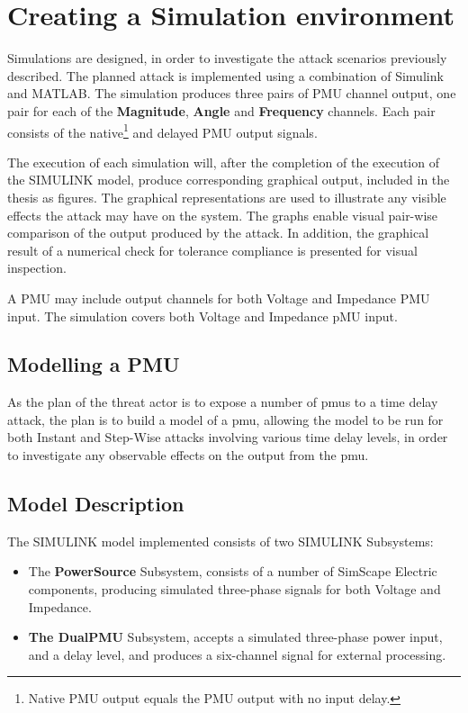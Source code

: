 \section{Creating a Simulation environment}

Simulations are designed, in order to investigate the attack scenarios previously described. The planned attack is implemented using a combination of Simulink and MATLAB. The simulation produces three pairs of PMU channel output, one pair for each of the \textbf{Magnitude}, \textbf{Angle} and \textbf{Frequency} channels.
Each pair consists of the native\footnote{Native PMU output equals the PMU output with no input delay.} and delayed  PMU output signals. 

The execution of each simulation will, after the completion of the execution of the SIMULINK model, produce corresponding graphical output, included in the thesis as figures. The graphical representations are used to illustrate any visible effects the attack may have on the system. The graphs enable visual pair-wise comparison of the output produced by the attack. In addition, the graphical result of a numerical check for tolerance compliance is presented for visual inspection.

A PMU may include output channels for both Voltage and Impedance PMU input. The simulation covers both Voltage and Impedance pMU input.

\subsection{Modelling a PMU}

As the plan of the threat actor is to expose  a number of \acrshort{pmu}s to a time  delay attack, the plan is to build a model of a \acrshort{pmu}, allowing the model to be run for both Instant and Step-Wise attacks involving various time delay levels, in order to investigate any observable effects on the output from the \acrshort{pmu}.
\subsection{Model Description}
The SIMULINK model implemented consists of two SIMULINK Subsystems:
\begin{itemize}
    \item The \textbf{PowerSource} Subsystem, consists of a number of SimScape Electric components, producing simulated three-phase signals for both  Voltage and Impedance.
    \item \textbf{The DualPMU} Subsystem, accepts a simulated three-phase power input, and a delay level, and produces a six-channel signal for external processing. 
\end{itemize}

